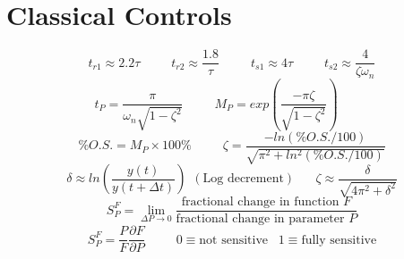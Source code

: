 \documentclass[twocolumn, 12pt]{article}    %
\begin{document}
\footnotesize
\RaggedRight
\section*{Classical Controls}%
\begin{equation*}
    t_{r1} \approx 2.2\tau \hspace{30pt} t_{r2} \approx\frac{1.8}{\tau} \hspace{30pt} t_{s1} \approx 4\tau \hspace{30pt} t_{s2} \approx\frac{4}{\zeta \omega_n}
\end{equation*}
\begin{equation*}
    t_P = \frac{\pi}{\omega_n\sqrt{1-\zeta^2}} \hspace{30pt} M_P = exp\left(\frac{-\pi\zeta}{\sqrt{1-\zeta^2}}  \right) \hspace{30pt} 
\end{equation*}
\begin{equation*}
    \%O.S. = M_P \times 100\% \hspace{30pt} \zeta = \frac{-ln(\%O.S./100)}{\sqrt{\pi^2 +ln^2(\%O.S. /100)}}
\end{equation*}
\begin{equation*}
    \delta \approx ln\left( \frac{y(t)}{y(t+\Delta t)} \right) \hspace{5pt} (\text{Log decrement}) \hspace{20pt} \zeta \approx \frac{\delta}{\sqrt{4\pi ^2 +\delta^2}} 
\end{equation*}
\begin{equation*}
    S_P^F = \lim_{\Delta P \to 0} \frac{\text{fractional change in function }F}{\text{fractional change in parameter }P}
\end{equation*}
\begin{equation*}
    S^F_P = \frac{P}{F}  \frac{\partial{F}}{\partial{P}} \hspace{30pt} 0 \equiv \text{not sensitive} \hspace{10pt} 1 \equiv \text{fully sensitive}
\end{equation*}
\end{document}
